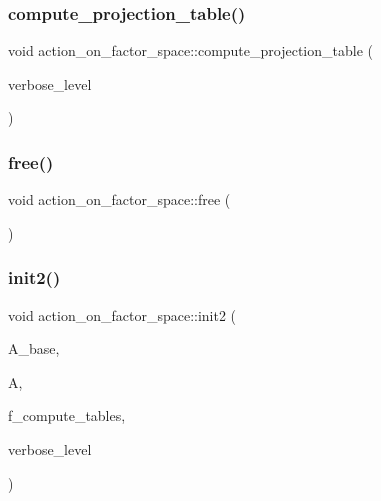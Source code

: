 \subsubsection{\texorpdfstring{compute\+\_\+projection\+\_\+table()}{compute\_projection\_table()}}
{\footnotesize\ttfamily void action\+\_\+on\+\_\+factor\+\_\+space\+::compute\+\_\+projection\+\_\+table (\begin{DoxyParamCaption}\item[{\mbox{\hyperlink{galois_8h_a09fddde158a3a20bd2dcadb609de11dc}{I\+NT}}}]{verbose\+\_\+level }\end{DoxyParamCaption})}

\mbox{\label{classaction__on__factor__space_a351511c66274e76321fc114c765cfdc2}} 
\subsubsection{\texorpdfstring{free()}{free()}}
{\footnotesize\ttfamily void action\+\_\+on\+\_\+factor\+\_\+space\+::free (\begin{DoxyParamCaption}{ }\end{DoxyParamCaption})}

\mbox{\label{classaction__on__factor__space_a19f5ed00bc68f67dd5bd331ff958df16}} 
\subsubsection{\texorpdfstring{init2()}{init2()}}
{\footnotesize\ttfamily void action\+\_\+on\+\_\+factor\+\_\+space\+::init2 (\begin{DoxyParamCaption}\item[{\mbox{\hyperlink{classaction}{action}} \&}]{A\+\_\+base,  }\item[{\mbox{\hyperlink{classaction}{action}} \&}]{A,  }\item[{\mbox{\hyperlink{galois_8h_a09fddde158a3a20bd2dcadb609de11dc}{I\+NT}}}]{f\+\_\+compute\+\_\+tables,  }\item[{\mbox{\hyperlink{galois_8h_a09fddde158a3a20bd2dcadb609de11dc}{I\+NT}}}]{verbose\+\_\+level }\end{DoxyParamCaption})}

